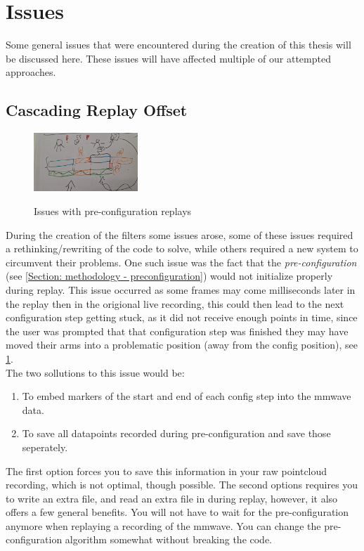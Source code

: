 \section{Issues}
\label{section: methodology - issues}

Some general issues that were encountered during the creation of this thesis will be discussed here.
These issues will have affected multiple of our attempted approaches.

\subsection{Cascading Replay Offset}
\label{sub-section: methodology - issues - cascading replay offset}

\begin{figure}
    \caption{Issues with pre-configuration replays}
    \centering
    \includegraphics[width=0.35\textwidth]{figures/pre-configuration replay issue.png}
    \label{fig: pre-config issue}
\end{figure}

During the creation of the filters some issues arose, some of these issues required a rethinking/rewriting of the code to solve, while others required a new system to circumvent their problems.
One such issue was the fact that the \textit{pre-configuration} (see \cref{Section: methodology - preconfiguration}) would not initialize properly during replay.
This issue occurred as some frames may come milliseconds later in the replay then in the origional live recording, this could then lead to the next configuration step getting stuck, as it did not receive enough points in time, since the user was prompted that that configuration step was finished they may have moved their arms into a problematic position (away from the config position), see \cref{fig: pre-config issue}.
\\
The two sollutions to this issue would be: 
\begin{enumerate}
    \item To embed markers of the start and end of each config step into the mmwave data. 
    \item To save all datapoints recorded during pre-configuration and save those seperately.
\end{enumerate}
The first option forces you to save this information in your raw pointcloud recording, which is not optimal, though possible. 
The second options requires you to write an extra file, and read an extra file in during replay, however, it also offers a few general benefits.
You will not have to wait for the pre-configuration anymore when replaying a recording of the mmwave.
You can change the pre-configuration algorithm somewhat without breaking the code.


